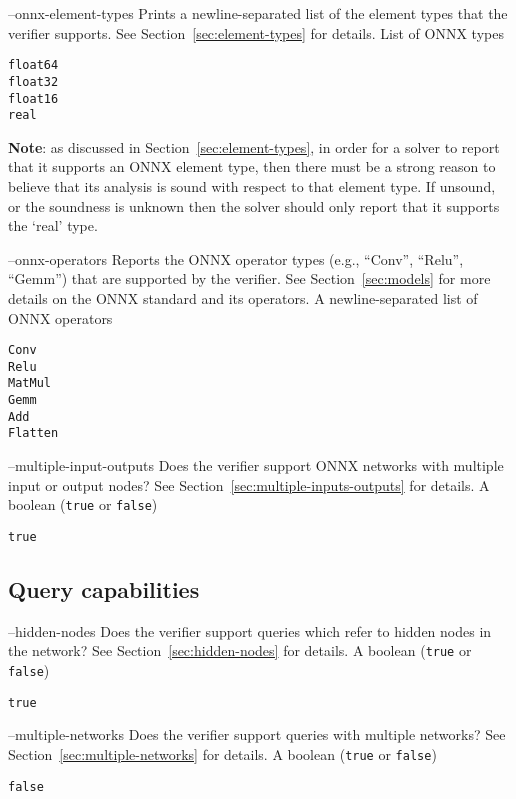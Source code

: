 \clOutputOption
{--onnx-element-types}
{Prints a newline-separated list of the element types that the verifier supports. See Section~\ref{sec:element-types} for details.}
{List of ONNX types}
\begin{lstlisting}[style=bash]
%*\exampleVerifier* supports --onnx-element-types
float64
float32
float16
real
\end{lstlisting}
\textbf{Note}: as discussed in Section~\ref{sec:element-types}, in order for a solver to report that it supports an ONNX element type, then there must be a strong reason to believe that its analysis is sound with respect to that element type. If unsound, or the soundness is unknown then the solver should only report that it supports the `real' type.

\clOutputOption
{--onnx-operators}
{Reports the ONNX operator types (e.g., ``Conv'', ``Relu'', ``Gemm'') that are supported by the verifier. See Section~\ref{sec:models} for more details on the ONNX standard and its operators.}
{A newline-separated list of ONNX operators}
\begin{lstlisting}[style=bash]
%*\exampleVerifier* supports --onnx-operators
Conv
Relu
MatMul
Gemm
Add
Flatten
\end{lstlisting}

\clOutputOption
{--multiple-input-outputs}
{Does the verifier support ONNX networks with multiple input or output nodes? See Section~\ref{sec:multiple-inputs-outputs} for details.}
{A boolean (\texttt{true} or \texttt{false})}
\begin{lstlisting}[style=bash]
%*\exampleVerifier* supports --multiple-inputs-outputs
true
\end{lstlisting}

\subsection{Query capabilities}

\clOutputOption
{--hidden-nodes}
{Does the verifier support queries which refer to hidden nodes in the network? See Section~\ref{sec:hidden-nodes} for details.}
{A boolean (\texttt{true} or \texttt{false})}
\begin{lstlisting}[style=bash]
%*\exampleVerifier* supports --hidden-nodes
true
\end{lstlisting}

\clOutputOption
{--multiple-networks}
{Does the verifier support queries with multiple networks? See Section~\ref{sec:multiple-networks} for details.}
{A boolean (\texttt{true} or \texttt{false})}
\begin{lstlisting}[style=bash]
%*\exampleVerifier* supports --multiple-networks
false
\end{lstlisting}

